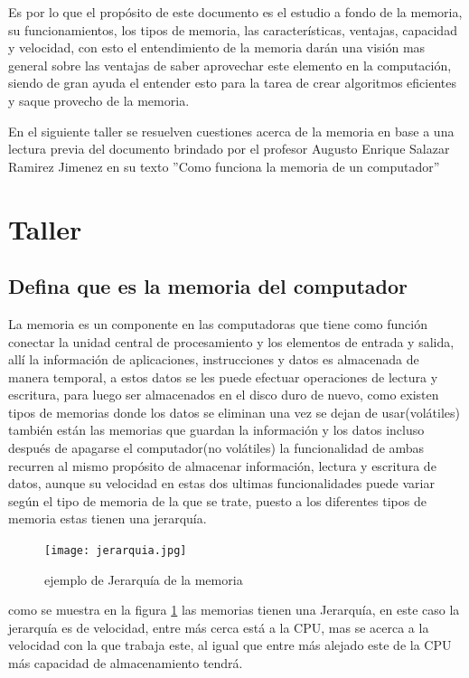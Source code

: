 \documentclass{article}
\begin{document}
Es por lo que el propósito de este documento es el estudio a fondo de la memoria, su funcionamientos, los tipos de memoria, las características, ventajas, capacidad y velocidad, con esto el entendimiento de la memoria darán una visión mas general sobre las ventajas de saber aprovechar este elemento en la computación, siendo de gran ayuda el entender esto para la tarea de crear algoritmos eficientes y saque provecho de la memoria. 


En el siguiente taller se resuelven cuestiones acerca de la memoria en base a una lectura previa del documento brindado por el profesor Augusto Enrique Salazar Ramirez Jimenez en su texto ''Como funciona la memoria de un computador''
\newpage
\section{Taller}

    \subsection{Defina que es la memoria del computador}
    La memoria es un componente en las computadoras que tiene como función conectar la unidad central de procesamiento y los elementos de entrada y salida, allí  la información de aplicaciones, instrucciones y datos es almacenada de manera temporal, a estos datos se les puede efectuar operaciones de lectura y escritura, para luego ser almacenados en el disco duro de nuevo, como existen tipos de memorias donde los datos se eliminan una vez se dejan de usar(volátiles) también están las memorias que guardan la información y los datos incluso después de apagarse el computador(no volátiles) la funcionalidad de ambas recurren al mismo propósito de almacenar información, lectura y escritura de datos, aunque su velocidad en estas dos ultimas funcionalidades puede variar según el tipo de memoria de la que se trate, puesto a los diferentes tipos de memoria estas tienen una jerarquía. \cite{Mano}
    
        \begin{figure}[h]
        \texttt{[image: jerarquia.jpg]}
        \centering
        \caption{ejemplo de Jerarquía de la memoria}
        \label{fig:Jerarquia}
        \end{figure}   
     
     como se muestra en la figura \ref{fig:Jerarquia} las memorias tienen una Jerarquía, en este caso la jerarquía es de velocidad, entre más cerca está a la CPU, mas se acerca a la velocidad con la que trabaja este, al igual que entre más alejado este de la CPU más capacidad de almacenamiento tendrá.  
        
\end{document}
